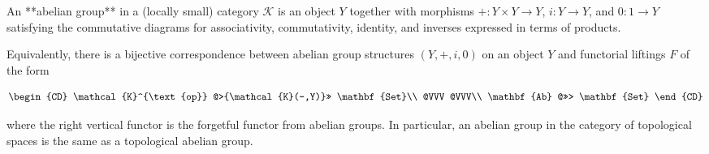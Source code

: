 An **abelian group** in a (locally small) category $\mathcal{K}$ is an object $Y$ together with morphisms $+: Y \times Y \rightarrow Y$, $i: Y \rightarrow Y$, and $0: 1 \rightarrow Y$ satisfying the commutative diagrams for associativity, commutativity, identity, and inverses expressed in terms of products.

Equivalently, there is a bijective correspondence between abelian group structures $(Y, +, i, 0)$ on an object $Y$ and functorial liftings $F$ of the form

\[
\begin{CD}
\mathcal{K}^{\text{op}} @>{\mathcal{K}(-,Y)}>> \mathbf{Set}\\
@VVV @VVV\\
\mathbf{Ab} @>>> \mathbf{Set}
\end{CD}
\]

where the right vertical functor is the forgetful functor from abelian groups. In particular, an abelian group in the category of topological spaces is the same as a topological abelian group.
